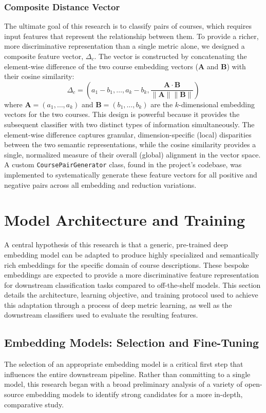 \subsubsection{Composite Distance Vector}\label{ch:3.2.3.2}
The ultimate goal of this research is to classify pairs of courses, which requires input features that represent the relationship between them. To provide a richer, more discriminative representation than a single metric alone, we designed a composite feature vector, \(\Delta_c\). The vector is constructed by concatenating the element-wise difference of the two course embedding vectors (\(\mathbf{A}\) and \(\mathbf{B}\)) with their cosine similarity:
\[ \Delta_c = \left(a_1 - b_1, \dots, a_k - b_k, \frac{\mathbf{A}\cdot\mathbf{B}}{\parallel \mathbf{A} \parallel \parallel \mathbf{B} \parallel } \right) \]
where \(\mathbf{A} = (a_1, \dots, a_k) \) and \(\mathbf{B} = (b_1, \dots, b_k) \) are the \(k\)-dimensional embedding vectors for the two courses. This design is powerful because it provides the subsequent classifier with two distinct types of information simultaneously. The element-wise difference captures granular, dimension-specific (local) disparities between the two semantic representations, while the cosine similarity provides a single, normalized measure of their overall (global) alignment in the vector space. A custom \verb|CoursePairGenerator| class, found in the project's codebase, was implemented to systematically generate these feature vectors for all positive and negative pairs across all embedding and reduction variations.

\section{Model Architecture and Training}\label{ch:3.3}
A central hypothesis of this research is that a generic, pre-trained deep embedding model can be adapted to produce highly specialized and semantically rich embeddings for the specific domain of course descriptions. These bespoke embeddings are expected to provide a more discriminative feature representation for downstream classification tasks compared to off-the-shelf models. This section details the architecture, learning objective, and training protocol used to achieve this adaptation through a process of deep metric learning, as well as the downstream classifiers used to evaluate the resulting features.

\subsection{Embedding Models: Selection and Fine-Tuning}\label{ch:3.3.1}
The selection of an appropriate embedding model is a critical first step that influences the entire downstream pipeline. Rather than committing to a single model, this research began with a broad preliminary analysis of a variety of open-source embedding models to identify strong candidates for a more in-depth, comparative study.


